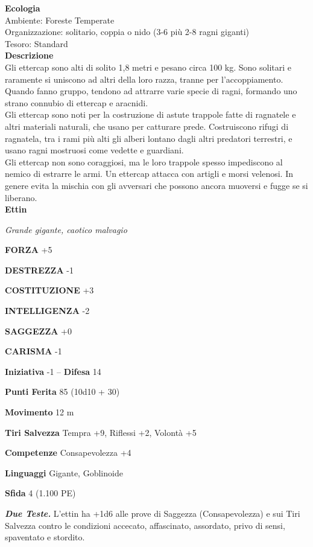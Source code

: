 \begin{multicols}{2}
\textbf{Ecologia}\\
Ambiente: Foreste Temperate\\
Organizzazione: solitario, coppia o nido (3-6 più 2-8 ragni giganti)\\
Tesoro: Standard\\
\textbf{Descrizione}\\
Gli ettercap sono alti di solito 1,8 metri e pesano circa 100 kg. Sono solitari e raramente si uniscono ad altri della loro razza, tranne per l'accoppiamento. Quando fanno gruppo, tendono ad attrarre varie specie di ragni, formando uno strano connubio di ettercap e aracnidi.\\
Gli ettercap sono noti per la costruzione di astute trappole fatte di ragnatele e altri materiali naturali, che usano per catturare prede. Costruiscono rifugi di ragnatela, tra i rami più alti gli alberi lontano dagli altri predatori terrestri, e usano ragni mostruosi come vedette e guardiani.\\
Gli ettercap non sono coraggiosi, ma le loro trappole spesso impediscono al nemico di estrarre le armi. Un ettercap attacca con artigli e morsi velenosi. In genere evita la mischia con gli avversari che possono ancora muoversi e fugge se si liberano.\\


\medskip{}\textbf{Ettin}

\emph{Grande gigante, caotico malvagio}

\textbf{FORZA} +5

\textbf{DESTREZZA} -1

\textbf{COSTITUZIONE} +3

\textbf{INTELLIGENZA} -2

\textbf{SAGGEZZA} +0

\textbf{CARISMA} -1

\textbf{Iniziativa} -1 -- \textbf{Difesa} 14

\textbf{Punti Ferita} 85 (10d10 + 30)

\textbf{Movimento} 12 m

\textbf{Tiri Salvezza} Tempra +9, Riflessi +2, Volontà +5

\textbf{Competenze} Consapevolezza +4

\textbf{Linguaggi} Gigante, Goblinoide

\textbf{Sfida} 4 (1.100 PE)

\emph{\textbf{Due Teste.}} L'ettin ha +1d6 alle prove di Saggezza (Consapevolezza) e sui Tiri Salvezza contro le condizioni accecato, affascinato, assordato, privo di sensi, spaventato e stordito.


\end{multicols}
